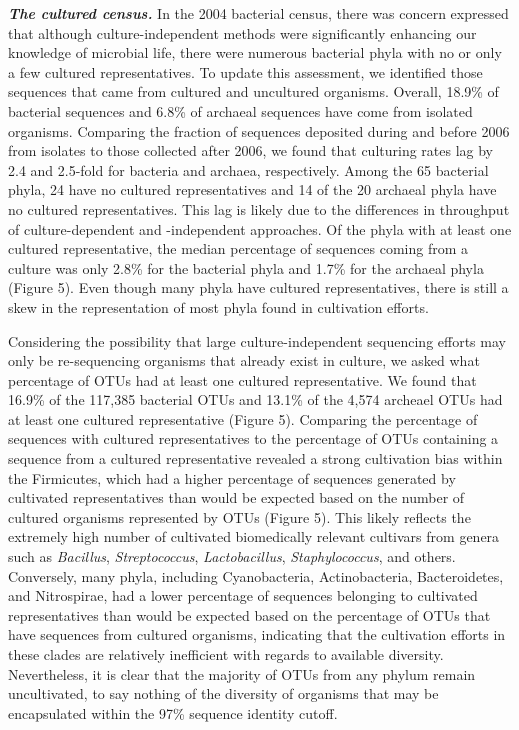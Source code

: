 \documentclass[11pt,]{article}
\begin{document}
\textbf{\emph{The cultured census.}} In the 2004 bacterial census, there
was concern expressed that although culture-independent methods were
significantly enhancing our knowledge of microbial life, there were
numerous bacterial phyla with no or only a few cultured representatives.
To update this assessment, we identified those sequences that came from
cultured and uncultured organisms. Overall, 18.9\% of bacterial
sequences and 6.8\% of archaeal sequences have come from isolated
organisms. Comparing the fraction of sequences deposited during and
before 2006 from isolates to those collected after 2006, we found that
culturing rates lag by 2.4 and 2.5-fold for bacteria and archaea,
respectively. Among the 65 bacterial phyla, 24 have no cultured
representatives and 14 of the 20 archaeal phyla have no cultured
representatives. This lag is likely due to the differences in throughput
of culture-dependent and -independent approaches. Of the phyla with at
least one cultured representative, the median percentage of sequences
coming from a culture was only 2.8\% for the bacterial phyla and 1.7\%
for the archaeal phyla (Figure 5). Even though many phyla have cultured
representatives, there is still a skew in the representation of most
phyla found in cultivation efforts.

Considering the possibility that large culture-independent sequencing
efforts may only be re-sequencing organisms that already exist in
culture, we asked what percentage of OTUs had at least one cultured
representative. We found that 16.9\% of the 117,385 bacterial OTUs and
13.1\% of the 4,574 archeael OTUs had at least one cultured
representative (Figure 5). Comparing the percentage of sequences with
cultured representatives to the percentage of OTUs containing a sequence
from a cultured representative revealed a strong cultivation bias within
the Firmicutes, which had a higher percentage of sequences generated by
cultivated representatives than would be expected based on the number of
cultured organisms represented by OTUs (Figure 5). This likely reflects
the extremely high number of cultivated biomedically relevant cultivars
from genera such as \emph{Bacillus}, \emph{Streptococcus},
\emph{Lactobacillus}, \emph{Staphylococcus}, and others. Conversely,
many phyla, including Cyanobacteria, Actinobacteria, Bacteroidetes, and
Nitrospirae, had a lower percentage of sequences belonging to cultivated
representatives than would be expected based on the percentage of OTUs
that have sequences from cultured organisms, indicating that the
cultivation efforts in these clades are relatively inefficient with
regards to available diversity. Nevertheless, it is clear that the
majority of OTUs from any phylum remain uncultivated, to say nothing of
the diversity of organisms that may be encapsulated within the 97\%
sequence identity cutoff.
\end{document}
